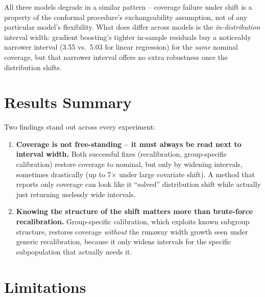 \documentclass[11pt]{article}
\begin{document}
All three models degrade in a similar pattern -- coverage failure under shift is a
property of the conformal procedure's exchangeability assumption, not of any
particular model's flexibility. What does differ across models is the
\emph{in-distribution} interval width: gradient boosting's tighter in-sample
residuals buy a noticeably narrower interval (3.55 vs.\ 5.03 for linear regression)
for the \emph{same} nominal coverage, but that narrower interval offers no extra
robustness once the distribution shifts.

\section{Results Summary}

Two findings stand out across every experiment:

\begin{enumerate}
  \item \textbf{Coverage is not free-standing -- it must always be read next to
    interval width.} Both successful fixes (recalibration, group-specific
    calibration) restore coverage to nominal, but only by widening intervals,
    sometimes drastically (up to 7$\times$ under large covariate shift). A method
    that reports only coverage can look like it ``solved'' distribution shift while
    actually just returning uselessly wide intervals.
  \item \textbf{Knowing the structure of the shift matters more than brute-force
    recalibration.} Group-specific calibration, which exploits known subgroup
    structure, restores coverage \emph{without} the runaway width growth seen under
    generic recalibration, because it only widens intervals for the specific
    subpopulation that actually needs it.
\end{enumerate}

\section{Limitations}
\end{document}
